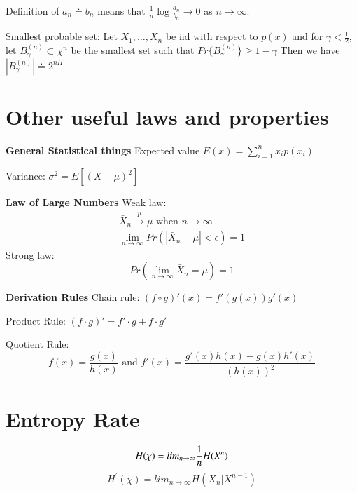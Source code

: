 \documentclass[10pt]{article}
\begin{document}
\begin{tiny}
\begin{multicols}{3}
Definition of $a_n \doteq b_n$ means that $\frac{1}{n}\log \frac{a_n}{b_n} \rightarrow 0$ as $n\rightarrow \infty$.

Smallest probable set: Let $X_1,\ldots, X_n$ be iid with respect to $p(x)$ and for $\gamma < \frac{1}{2}$, let $B_\gamma^{(n)} \subset \chi^n$ be the smallest set such that $Pr\{ B_\gamma^{(n)} \} \geq 1-\gamma $ Then we have $|B_\gamma^{(n)}| \doteq 2^{nH}$

\section*{Other useful laws and properties}
{\bf General Statistical things} Expected value $E(x)=\sum_{i=1}^n x_i p(x_i)$

Variance: $\sigma^2 = E\left[ \left(X-\mu\right)^2\right]$

{\bf Law of Large Numbers} Weak law:
\begin{eqnarray*}
\bar{X}_n\overset{p}\rightarrow \mu \text{ when } n \rightarrow \infty\\
\lim_{n\rightarrow \infty} Pr\left(|\bar{X}_n-\mu| < \epsilon \right) = 1
\end{eqnarray*}
Strong law:
\begin{equation}
Pr\left(\lim_{n\rightarrow \infty} \bar{X}_n = \mu \right) = 1
\end{equation}

{\bf Derivation Rules} Chain rule: $(f \circ g)'(x)=f'(g(x))g'(x)$

Product Rule: $(f\cdot g)' = f' \cdot g + f \cdot g'$

Quotient Rule: \[f(x)=\frac{g(x)}{h(x)}\text{ and }f'(x)=\frac{g'(x)h(x)-g(x)h'(x)}{\left(h(x)\right)^2}\]







\section*{Entropy Rate}
\begin{equation}
H(\chi) = lim_{n \to \infty} \frac{1}{n} H(X^n) \\
\end{equation}
\begin{equation}
H^\prime(\chi) = lim_{n \to \infty} H(X_n | X^{n-1})
\end{equation}


\end{multicols}
\end{tiny}
\end{document}
